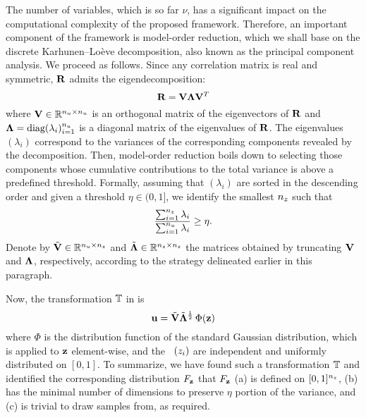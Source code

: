 The number of variables, which is so far $\nu$, has a significant impact on the
computational complexity of the proposed framework. Therefore, an important
component of the framework is model-order reduction, which we shall base on the
discrete Karhunen--Lo\`{e}ve decomposition, also known as the principal
component analysis. We proceed as follows. Since any correlation matrix is real
and symmetric, $\mathbf{R}$ admits the eigendecomposition:
\[
  \mathbf{R} = \mathbf{V} \mathbf{\Lambda} \mathbf{V}^T
\]
where $\mathbf{V} \in \mathbb{R}^{{n_u} \times {n_u}}$ is an orthogonal matrix of the
eigenvectors of $\mathbf{R}$ and $\mathbf{\Lambda} = \text{diag}(\lambda_i)_{i = 1}^{n_u}$
is a diagonal matrix of the eigenvalues of $\mathbf{R}$. The eigenvalues
$(\lambda_i)$ correspond to the variances of the corresponding components
revealed by the decomposition. Then, model-order reduction boils down to
selecting those components whose cumulative contributions to the total variance
is above a predefined threshold. Formally, assuming that $(\lambda_i)$ are
sorted in the descending order and given a threshold $\eta \in (0, 1]$, we
identify the smallest ${n_z}$ such that
\[
  \frac{\sum_{i = 1}^{n_z} \lambda_i}{\sum_{i = 1}^{n_u} \lambda_i} \geq \eta.
\]
Denote by $\tilde{\mathbf{V}} \in \mathbb{R}^{{n_u} \times {n_z}}$ and $\tilde{\mathbf{\Lambda}}
\in\mathbb{R}^{{n_z} \times {n_z}}$ the matrices obtained by truncating $\mathbf{V}$ and
$\mathbf{\Lambda}$, respectively, according to the strategy delineated earlier in
this paragraph.

Now, the transformation $\mathbb{T}$ in  is
\[
  \mathbf{u} = \tilde{\mathbf{V}} \tilde{\mathbf{\Lambda}}^\frac{1}{2} \, \Phi(\mathbf{z})
\]
where $\Phi$ is the distribution function of the standard Gaussian distribution,
which is applied to $\mathbf{z}$ element-wise, and the \rvs\ $(z_i)$ are independent
and uniformly distributed on $[0, 1]$. To summarize, we have found such a
transformation $\mathbb{T}$ and identified the corresponding distribution
$F_{\mathbf{z}}$ that $F_{\mathbf{z}}$ (a) is defined on $[0, 1]^{n_z}$, (b)
has the minimal number of dimensions to preserve $\eta$ portion of the variance,
and (c) is trivial to draw samples from, as required.
